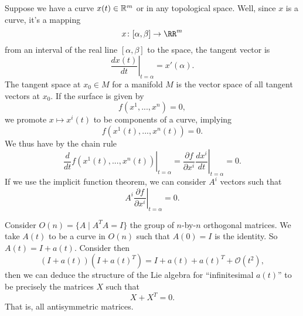 Suppose we have a curve $x(t)\in\Bbb{R}^{m}$ or in any
topological space. Well, since $x$ is a curve, it's a mapping
\begin{equation}
x\colon[\alpha,\beta]\to\RR^{m}
\end{equation}
from an interval of the real line $[\alpha,\beta]$ to the space,
the tangent vector is
\begin{equation}
\left.\frac{dx(t)}{dt}\right|_{t=\alpha}=x'(\alpha).
\end{equation}
The tangent space at $x_{0}\in M$ for a manifold $M$ is the
vector space of all tangent vectors at $x_{0}$. If the surface is
given by
\begin{equation}
f(x^1,...,x^n)=0,
\end{equation}
we promote $x\mapsto x^{i}(t)$ to be components of a curve,
implying
\begin{equation}
f(x^{1}(t),...,x^{n}(t))=0.
\end{equation}
We thus have by the chain rule
\begin{equation}
\left.\frac{d}{dt}f(x^{1}(t),...,x^{n}(t))\right|_{t=\alpha}=\left.\frac{\partial
  f}{\partial x^i}\frac{dx^i}{dt}\right|_{t=\alpha}=0.
\end{equation}
If we use the implicit function theorem, we can consider $A^{i}$
vectors such that
\begin{equation}
\left.A^{i}\frac{\partial f}{\partial x^{i}}\right|_{t=\alpha}=0.
\end{equation}

\begin{ex}
Consider $O(n)=\{A\mid A^{T}A=I\}$ the group of $n$-by-$n$
orthogonal matrices. We take $A(t)$ to be a curve in $O(n)$ such
that $A(0)=I$ is the identity. So $A(t)=I+a(t)$. Consider then
\begin{equation}
(I+a(t))(I+a(t)^{T})=I+a(t)+a(t)^{T}+\mathcal{O}(t^{2}),
\end{equation}
then we can deduce the structure of the Lie algebra for
``infinitesimal $a(t)$'' to be precisely the matrices $X$ such
that
\begin{equation}
X+X^{T}=0.
\end{equation}
That is, all antisymmetric matrices.
\end{ex}


